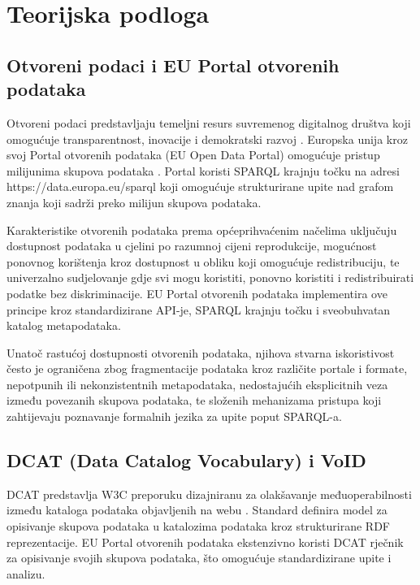 \chapter{Teorijska podloga}
\label{ch:background}


\section{Otvoreni podaci i EU Portal otvorenih podataka}
\label{sec:open_data}

Otvoreni podaci predstavljaju temeljni resurs suvremenog digitalnog društva koji omogućuje transparentnost, inovacije i demokratski razvoj \cite{janssen2012benefits, charalabidis2018open, bizer2009linked}. Europska unija kroz svoj Portal otvorenih podataka (EU Open Data Portal) omogućuje pristup milijunima skupova podataka \cite{wilson2013developing}. Portal koristi SPARQL krajnju točku na adresi https://data.europa.eu/sparql koji omogućuje strukturirane upite nad grafom znanja koji sadrži preko milijun skupova podataka.

Karakteristike otvorenih podataka prema općeprihvaćenim načelima uključuju dostupnost podataka u cjelini po razumnoj cijeni reprodukcije, mogućnost ponovnog korištenja kroz dostupnost u obliku koji omogućuje redistribuciju, te univerzalno sudjelovanje gdje svi mogu koristiti, ponovno koristiti i redistribuirati podatke bez diskriminacije. EU Portal otvorenih podataka implementira ove principe kroz standardizirane API-je, SPARQL krajnju točku i sveobuhvatan katalog metapodataka.

Unatoč rastućoj dostupnosti otvorenih podataka, njihova stvarna iskoristivost često je ograničena zbog fragmentacije podataka kroz različite portale i formate, nepotpunih ili nekonzistentnih metapodataka, nedostajućih eksplicitnih veza između povezanih skupova podataka, te složenih mehanizama pristupa koji zahtijevaju poznavanje formalnih jezika za upite poput SPARQL-a.

\section{DCAT (Data Catalog Vocabulary) i VoID}
\label{sec:dcat}

DCAT predstavlja W3C preporuku dizajniranu za olakšavanje međuoperabilnosti između kataloga podataka objavljenih na webu \cite{dcat2020}. Standard definira model za opisivanje skupova podataka u katalozima podataka kroz strukturirane RDF reprezentacije. EU Portal otvorenih podataka ekstenzivno koristi DCAT rječnik za opisivanje svojih skupova podataka, što omogućuje standardizirane upite i analizu.

